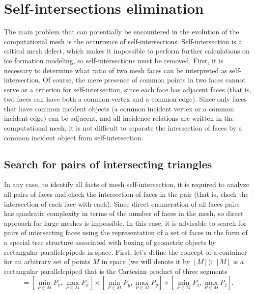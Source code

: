 \documentclass[
11pt,
tightenlines,
twoside,
onecolumn,
nofloats,
nobibnotes,
nofootinbib,
superscriptaddress,
noshowpacs,
centertags]
{revtex4-2}
\begin{document}

\section{Self-intersections elimination}

The main problem that can potentially be encountered in the evolution of the computational mesh is the occurrence of self-intersections.
Self-intersection is a critical mesh defect, which makes it impossible to perform further calculations on ice formation modeling, so self-intersections must be removed.
First, it is necessary to determine what ratio of two mesh faces can be interpreted as self-intersection.
Of course, the mere presence of common points in two faces cannot serve as a criterion for self-intersection, since each face has adjacent faces (that is, two faces can have both a common vertex and a common edge).
Since only faces that have common incident objects  (a common
incident vertex or a common incident edge) can be adjacent, and all
incidence relations are written in the computational mesh, it is not
difficult to separate the intersection of faces by a common incident
object from self-intersection.

\subsection{Search for pairs of intersecting triangles}

In any case, to identify all facts of mesh self-intersection, it is required to analyze all pairs of faces and check the intersection of faces in the pair (that is, check the intersection of each face with each).
Since direct enumeration of all faces pairs has quadratic complexity in terms of the number of faces in the mesh, so direct approach for large meshes is impossible.
In this case, it is advisable to search for pairs of intersecting faces using the representation of a set of faces in the form of a special tree structure associated with boxing of geometric objects by rectangular parallelepipeds in space.
First, let's define the concept of a container for an  arbitrary set
of points $M$ in space (we will denote it by $[M]$): $[M]$ is a
rectangular parallelepiped that is the Cartesian product of three
segments
\begin{equation}
[M] = \left[\min_{P \in M}{P_x}, \max_{P \in M}{P_x}\right]
      \times \left[\min_{P \in M}{P_y}, \max_{P \in M}{P_y}\right]
      \times \left[\min_{P \in M}{P_z}, \max_{P \in M}{P_z}\right].
\end{equation}
\end{document}
